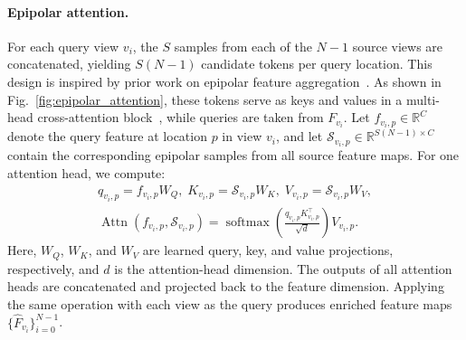 \paragraph{Epipolar attention.}
For each query view \(v_i\), the \(S\) samples from each of the \(N-1\) source views are concatenated, yielding \(S(N-1)\) candidate tokens per query location.
This design is inspired by prior work on epipolar feature aggregation~\cite{he2020epipolar}.
As shown in Fig.~\ref{fig:epipolar_attention}, these tokens serve as keys and values in a multi-head cross-attention block~\cite{vaswani2017attention}, while queries are taken from \(F_{v_i}\).
Let \(f_{v_i,p}\in\mathbb{R}^{C}\) denote the query feature at location \(p\) in view \(v_i\), and let \(\mathcal{S}_{v_i,p}\in\mathbb{R}^{S(N-1)\times C}\) contain the corresponding epipolar samples from all source feature maps.
For one attention head, we compute:
\begin{equation}
\begin{gathered}
q_{v_i,p} = f_{v_i,p}W_Q, \; K_{v_i,p} = \mathcal{S}_{v_i,p}W_K, \; V_{v_i,p} = \mathcal{S}_{v_i,p}W_V, \\
\operatorname{Attn}(f_{v_i,p},\mathcal{S}_{v_i,p})
=
\operatorname{softmax}\!\left(
\frac{q_{v_i,p}K_{v_i,p}^{\top}}{\sqrt{d}}
\right)V_{v_i,p}.
\end{gathered}
\end{equation}
Here, \(W_Q\), \(W_K\), and \(W_V\) are learned query, key, and value projections, respectively, and \(d\) is the attention-head dimension.
The outputs of all attention heads are concatenated and projected back to the feature dimension.
Applying the same operation with each view as the query produces enriched feature maps \(\{\hat{F}_{v_i}\}_{i=0}^{N-1}\).

